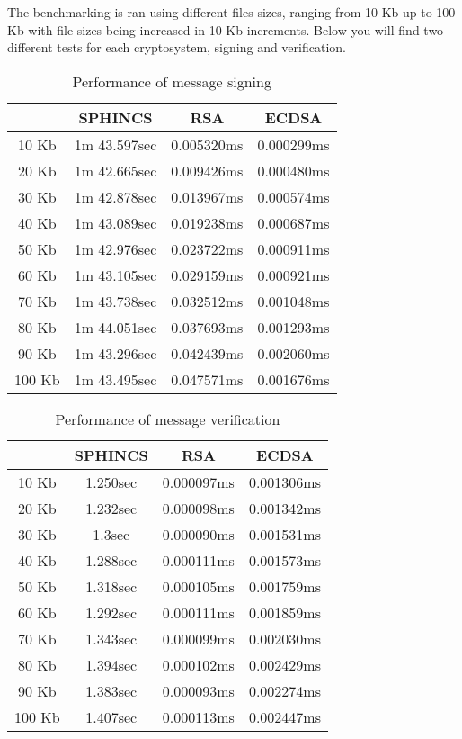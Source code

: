 \documentclass[12pt,a4paper]{article}
\begin{document}
The benchmarking is ran using different files sizes, ranging from 10 Kb up to 100 Kb with file sizes being increased in 10 Kb increments. Below you will find two different tests for each cryptosystem, signing and verification.

\begin{table} [H]
\centering
\caption{Performance of message signing}
\begin{tabular}{|c|c|c|c|}
\hline 
 & SPHINCS & RSA & ECDSA \\ 
\hline 
10 Kb & 1m 43.597sec & 0.005320ms & 0.000299ms \\ 
\hline 
20 Kb & 1m 42.665sec & 0.009426ms & 0.000480ms \\ 
\hline 
30 Kb & 1m 42.878sec & 0.013967ms & 0.000574ms \\ 
\hline 
40 Kb & 1m 43.089sec & 0.019238ms & 0.000687ms \\ 
\hline 
50 Kb & 1m 42.976sec & 0.023722ms & 0.000911ms \\ 
\hline 
60 Kb & 1m 43.105sec & 0.029159ms & 0.000921ms \\ 
\hline 
70 Kb & 1m 43.738sec & 0.032512ms & 0.001048ms \\ 
\hline 
80 Kb & 1m 44.051sec & 0.037693ms & 0.001293ms \\ 
\hline 
90 Kb & 1m 43.296sec & 0.042439ms & 0.002060ms \\ 
\hline 
100 Kb & 1m 43.495sec & 0.047571ms & 0.001676ms \\ 
\hline 
\end{tabular} 
\end{table}

\begin{table} [H]
\centering
\caption{Performance of message verification}
\begin{tabular}{|c|c|c|c|}
\hline 
 & SPHINCS & RSA & ECDSA \\ 
\hline 
10 Kb & 1.250sec & 0.000097ms & 0.001306ms \\ 
\hline 
20 Kb & 1.232sec & 0.000098ms & 0.001342ms \\ 
\hline 
30 Kb & 1.3sec & 0.000090ms & 0.001531ms \\ 
\hline 
40 Kb & 1.288sec & 0.000111ms & 0.001573ms \\ 
\hline 
50 Kb & 1.318sec & 0.000105ms & 0.001759ms \\ 
\hline 
60 Kb & 1.292sec & 0.000111ms & 0.001859ms \\ 
\hline 
70 Kb & 1.343sec & 0.000099ms & 0.002030ms \\ 
\hline 
80 Kb & 1.394sec & 0.000102ms & 0.002429ms \\ 
\hline 
90 Kb & 1.383sec & 0.000093ms & 0.002274ms \\ 
\hline 
100 Kb & 1.407sec & 0.000113ms & 0.002447ms \\ 
\hline 
\end{tabular} 
\end{table}
\end{document}
